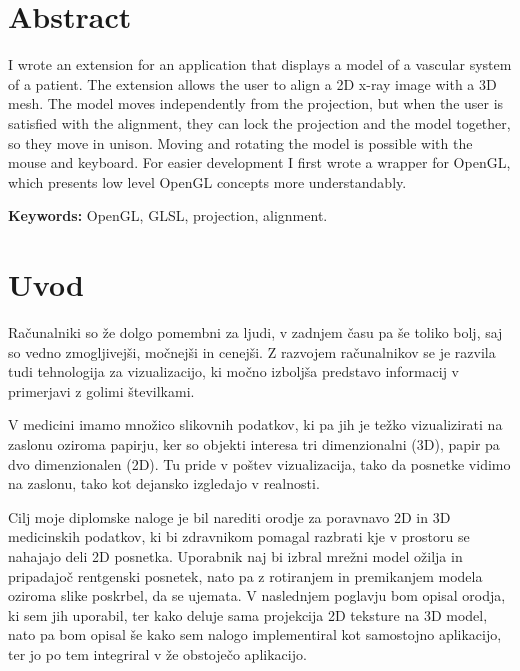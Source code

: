 \documentclass[a4paper, 12pt]{book}
\newcommand{\tkeywordsEn}{OpenGL, GLSL, projection, alignment}
\newcommand{\clearemptydoublepage}{\newpage{\pagestyle{empty}\cleardoublepage}}
\begin{document}
\chapter*{Abstract}
I wrote an extension for an application that displays a model of a vascular system of a patient. The extension allows the user to align a 2D x-ray image with a 3D mesh. The model moves independently from the projection, but when the user is satisfied with the alignment, they can lock the projection and the model together, so they move in unison. Moving and rotating the model is possible with the mouse and keyboard. For easier development I first wrote a wrapper for OpenGL, which presents low level OpenGL concepts more understandably.
\bigskip

\noindent\textbf{Keywords:} \tkeywordsEn.
\clearemptydoublepage

\mainmatter
\setcounter{page}{1}
\pagestyle{fancy}

\chapter{Uvod}
Računalniki so že dolgo pomembni za ljudi, v zadnjem času pa še toliko bolj, saj so vedno zmogljivejši, močnejši in cenejši. Z razvojem računalnikov se je razvila tudi tehnologija za vizualizacijo, ki močno izboljša predstavo informacij v primerjavi z golimi številkami. 

V medicini imamo množico slikovnih podatkov, ki pa jih je težko vizualizirati na zaslonu oziroma papirju, ker so objekti interesa tri dimenzionalni (3D), papir pa dvo dimenzionalen (2D). Tu pride v poštev vizualizacija, tako da posnetke vidimo na zaslonu, tako kot dejansko izgledajo v realnosti.

Cilj moje diplomske naloge je bil narediti orodje za poravnavo 2D in 3D medicinskih podatkov, ki bi zdravnikom pomagal razbrati kje v prostoru se nahajajo deli 2D posnetka. Uporabnik naj bi izbral mrežni model ožilja in pripadajoč rentgenski posnetek, nato pa z rotiranjem in premikanjem modela oziroma slike poskrbel, da se ujemata. V naslednjem poglavju bom opisal orodja, ki sem jih uporabil, ter kako deluje sama projekcija 2D teksture na 3D model, nato pa bom opisal še kako sem nalogo implementiral kot samostojno aplikacijo, ter jo po tem integriral v že obstoječo aplikacijo.
\end{document}
